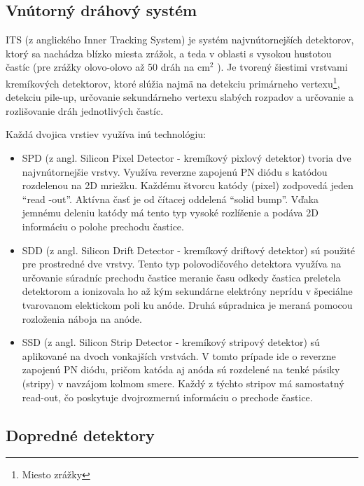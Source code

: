 \documentclass[thesismargins, thesislinespacing]{rnthesis}
\begin{document}
\subsection{Vnútorný dráhový systém}

ITS (z anglického Inner Tracking System) je systém najvnútornejších detektorov, ktorý sa nachádza blízko miesta zrážok, a teda v oblasti s vysokou hustotou častíc (pre zrážky olovo-olovo až 50 dráh na $\mathrm{cm}^2$ ). Je tvorený šiestimi vrstvami kremíkových detektorov, ktoré slúžia najmä na detekciu primárneho vertexu\footnote{Miesto zrážky}, detekciu pile-up, určovanie sekundárneho vertexu slabých rozpadov a určovanie a rozlišovanie dráh jednotlivých častíc. 

Každá dvojica vrstiev využíva inú technológiu:
\begin{itemize}
	\item SPD (z angl. Silicon Pixel Detector - kremíkový pixlový detektor) tvoria dve najvnútornejšie vrstvy. Využíva reverzne zapojenú PN diódu s katódou rozdelenou na 2D mriežku. Každému štvorcu katódy (pixel) zodpovedá jeden “read -out”. Aktívna časť je od čítacej oddelená “solid bump”. Vďaka jemnému deleniu katódy má tento typ vysoké rozlíšenie a podáva 2D informáciu o polohe prechodu častice. 
	\item SDD (z angl. Silicon Drift Detector - kremíkový driftový detektor) sú použité pre prostredné dve vrstvy. Tento typ polovodičového detektora využíva na určovanie súradníc prechodu častice meranie času odkedy častica preletela detektorom a ionizovala ho až kým sekundárne elektróny neprídu v špeciálne tvarovanom elektickom poli ku anóde. Druhá súpradnica je meraná pomocou rozloženia náboja na anóde.
	\item SSD (z angl. Silicon Strip Detector - kremíkový stripový detektor) sú aplikované na dvoch vonkajších vrstvách. V tomto prípade ide o reverzne zapojenú PN diódu, pričom katóda aj anóda sú rozdelené na tenké pásiky (stripy) v navzájom kolmom smere. Každý z týchto stripov má samostatný read-out, čo poskytuje dvojrozmernú informáciu o prechode častice. 
\end{itemize}
\subsection{Dopredné detektory}
\end{document}
